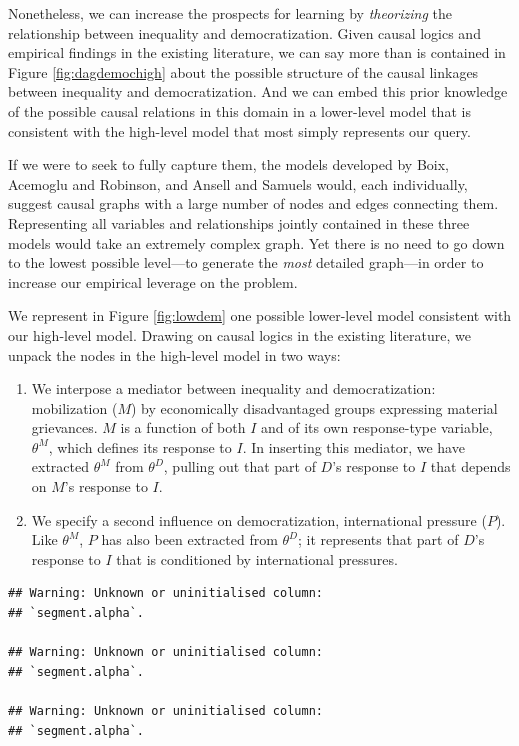 \documentclass[
  12pt,
]{book}
\begin{document}
Nonetheless, we can increase the prospects for learning by \emph{theorizing} the relationship between inequality and democratization. Given causal logics and empirical findings in the existing literature, we can say more than is contained in Figure \ref{fig:dagdemochigh} about the possible structure of the causal linkages between inequality and democratization. And we can embed this prior knowledge of the possible causal relations in this domain in a lower-level model that is consistent with the high-level model that most simply represents our query.

If we were to seek to fully capture them, the models developed by Boix, Acemoglu and Robinson, and Ansell and Samuels would, each individually, suggest causal graphs with a large number of nodes and edges connecting them. Representing all variables and relationships jointly contained in these three models would take an extremely complex graph. Yet there is no need to go down to the lowest possible level---to generate the \emph{most} detailed graph---in order to increase our empirical leverage on the problem.

We represent in Figure \ref{fig:lowdem} one possible lower-level model consistent with our high-level model. Drawing on causal logics in the existing literature, we unpack the nodes in the high-level model in two ways:

\begin{enumerate}
\def\labelenumi{\arabic{enumi}.}
\item
  We interpose a mediator between inequality and democratization: mobilization (\(M\)) by economically disadvantaged groups expressing material grievances. \(M\) is a function of both \(I\) and of its own response-type variable, \(\theta^M\), which defines its response to \(I\). In inserting this mediator, we have extracted \(\theta^M\) from \(\theta^D\), pulling out that part of \(D\)'s response to \(I\) that depends on \(M\)'s response to \(I\).
\item
  We specify a second influence on democratization, international pressure (\(P\)). Like \(\theta^M\), \(P\) has also been extracted from \(\theta^D\); it represents that part of \(D\)'s response to \(I\) that is conditioned by international pressures.
\end{enumerate}

\begin{verbatim}
## Warning: Unknown or uninitialised column:
## `segment.alpha`.

## Warning: Unknown or uninitialised column:
## `segment.alpha`.

## Warning: Unknown or uninitialised column:
## `segment.alpha`.
\end{verbatim}
\end{document}
